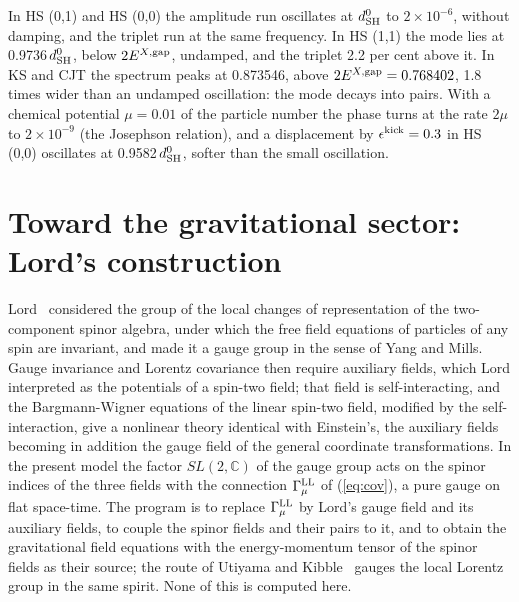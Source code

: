 \documentclass[aps,prd,onecolumn,superscriptaddress,nofootinbib,floatfix,longbibliography]{revtex4-2}
\newcommand{\LL}{{\rm LL}}
\newcommand{\SH}{{\rm SH}}
\begin{document}
In HS (0,1) and HS (0,0) the amplitude run oscillates at $d^0_\SH$ to \ensuremath{2\times10^{-6}}, without damping, and the triplet run
at the same frequency. In HS (1,1) the mode lies at 0.9736\,$d^0_\SH$, below $2E^{X,{\rm gap}}$, undamped, and the
triplet 2.2 per cent above it. In KS and CJT the spectrum peaks at 0.873546, above $2E^{X,{\rm gap}}=0.768402$,
1.8 times wider than an undamped oscillation: the mode decays into pairs. With a chemical potential $\mu=0.01$ of
the particle number the phase turns at the rate $2\mu$ to \ensuremath{2\times10^{-9}} (the Josephson relation), and a displacement by
$\epsilon^{\rm kick}=0.3$ in HS (0,0) oscillates at 0.9582\,$d^0_\SH$, softer than the small oscillation.

\section{Toward the gravitational sector: Lord's construction}
\label{sec:gravity}

Lord~\cite{Lord1971} considered the group of the local changes of representation of the two-component spinor algebra,
under which the free field equations of particles of any spin are invariant, and made it a gauge group in the sense of
Yang and Mills. Gauge invariance and Lorentz covariance then require auxiliary fields, which Lord interpreted as the
potentials of a spin-two field; that field is self-interacting, and the Bargmann-Wigner equations of the linear spin-two
field, modified by the self-interaction, give a nonlinear theory identical with Einstein's, the auxiliary fields becoming
in addition the gauge field of the general coordinate transformations. In the present model the factor $SL(2,\mathbb C)$
of the gauge group acts on the spinor indices of the three fields with the connection $\Gamma^\LL_\mu$ of (\ref{eq:cov}),
a pure gauge on flat space-time. The program is to replace $\Gamma^\LL_\mu$ by Lord's gauge field and its auxiliary fields,
to couple the spinor fields and their pairs to it, and to obtain the gravitational field equations with the
energy-momentum tensor of the spinor fields as their source; the route of Utiyama and Kibble~\cite{Utiyama1956,Kibble1961,Hehl1976}
gauges the local Lorentz group in the same spirit. None of this is computed here.

\end{document}
